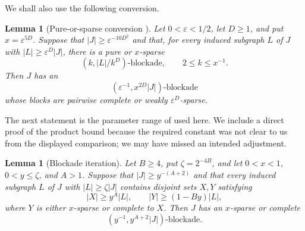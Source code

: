 \documentclass[11pt]{article}
\numberwithin{equation}{section}
\theoremstyle{plain}
\newtheorem{lemma}[theorem]{Lemma}
\theoremstyle{definition}
\begin{document}
We shall also use the following conversion.

\begin{lemma}[Pure-or-sparse conversion
{\cite[Lemma~2.5]{HuangJuZhou2026}}]
\label{lem:hjz-pure-sparse-conversion}
Let $0<\varepsilon<1/2$, let $D\geq1$, and put
$x=\varepsilon^{5D}$.  Suppose that
$|J|\geq\varepsilon^{-10D^2}$ and that, for every induced subgraph
$L$ of $J$ with $|L|\geq\varepsilon^D|J|$, there is a pure or
$x$-sparse
\[
                    (k,|L|/k^D)\text{-blockade},
             \qquad 2\leq k\leq x^{-1}.
\]
Then $J$ has an
\[
       (\varepsilon^{-1},x^{2D}|J|)\text{-blockade}
\]
whose blocks are pairwise complete or weakly
$\varepsilon^D$-sparse.
\end{lemma}

The next statement is the parameter range of
\cite[Lemma~2.8]{HuangJuZhou2026} used here.  We include a direct proof
of the product bound because the required constant was not clear to us
from the displayed comparison; we may have missed an intended
adjustment.

\begin{lemma}[Blockade iteration]
\label{lem:hjz-blockade-iteration}
Let $B\geq4$, put $\zeta=2^{-4B}$, and let
$0<x<1$, $0<y\leq\zeta$, and $A>1$.  Suppose that
$|J|\geq y^{-(A+2)}$ and that every induced subgraph $L$ of $J$ with
$|L|\geq\zeta|J|$ contains disjoint sets $X,Y$ satisfying
\[
 |X|\geq y^A|L|,\qquad
 |Y|\geq(1-By)|L|,
\]
where $Y$ is either $x$-sparse or complete to $X$.  Then $J$ has an
$x$-sparse or complete
\[
                     (y^{-1},y^{A+2}|J|)\text{-blockade}.
\]
\end{lemma}
\end{document}
